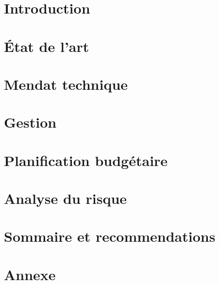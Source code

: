 \documentclass[canadien, 12pt]{article}
\begin{document}



\newpage


\tableofcontents
\newpage

\listoffigures
\listoftables
\newpage


\section{Introduction}


\section{État de l'art}


\section{Mendat technique}


\section{Gestion}


\section{Planification budgétaire}


\section{Analyse du risque}


\section{Sommaire et recommendations}


\section{Annexe}
{}

\end{document}
